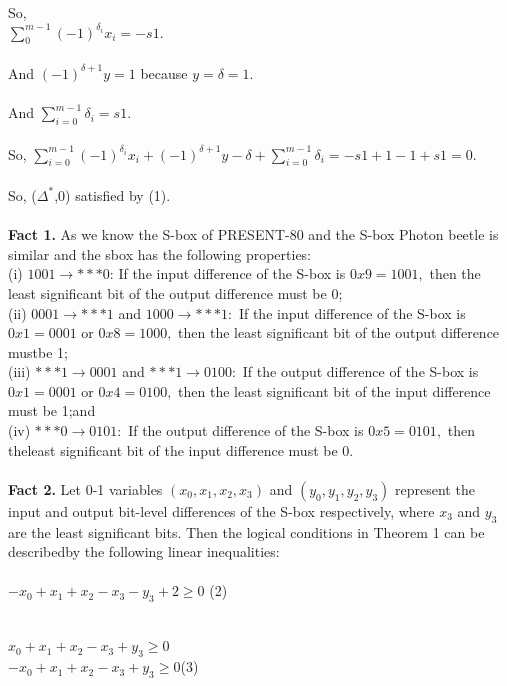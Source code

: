 \documentclass{article}
\begin{document}
So,\\ $\sum_{0}^{m-1}(-1)^{\delta_i}x_i = -s1$.\\\\
And $(-1)^{\delta+1}y=1$ because $y = \delta = 1$.\\\\
And $\sum_{i=0}^{m-1}\delta_i = s1$.\\\\
So,  $\sum_{i=0}^{m-1}(-1)^{\delta_i}x_i + (-1)^{\delta+1}y - \delta + \sum_{i=0}^{m-1}\delta_i = -s1 + 1 - 1 + s1 = 0.$\\\\
So, ($\Delta^*$,0)  satisfied by (1).\\\\
\textbf{Fact 1.} As we know the S-box of PRESENT-80 and the S-box Photon beetle is similar and the sbox has the following properties:\\
(i) $1001 \rightarrow ***0$: If the input difference of the S-box is $0x9 = 1001,$ then the least significant bit of the output difference must be 0;\\
(ii) $0001 \rightarrow ***1$ and $1000  \rightarrow ***1:$ If the input difference of the S-box is $0x1 = 0001$ or $0x8 = 1000,$ then the least significant bit of the output difference mustbe 1;\\
(iii) $***1 \rightarrow 0001$ and $***1  \rightarrow  0100:$ If the output difference of the S-box is $0x1 = 0001$ or $0x4 = 0100,$ then the least significant bit of the input difference must be 1;and\\
(iv) $***0  \rightarrow  0101:$ If the output difference of the S-box is $0x5 = 0101,$ then theleast significant bit of the input difference must be 0.\\\\
\textbf{Fact 2.} Let 0-1 variables $(x_0,x_1,x_2,x_3)$ and $(y_0,y_1,y_2,y_3)$ represent the input and output bit-level differences of the S-box respectively, where $x_3$ and $y_3$ are the least significant bits. Then the logical conditions in Theorem 1 can be describedby the following linear inequalities:\\\\
$-x_0 + x_1 + x_2 - x_3 - y_3 + 2 \ge 0$ \hspace{7.1cm} (2)\\\\\\
$x_0+x_1+x_2-x_3+y_3 \ge 0$\\
$-x_0+x_1+x_2-x_3+y_3 \ge 0$\hspace{8cm}(3)\\\\
\end{document}
